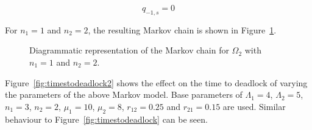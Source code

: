\documentclass{article}
\numberwithin{equation}{section}
\begin{document}
\begin{equation}\label{eqn:2nsssC}
  q_{-1, s} = 0
\end{equation}

For $n_1 = 1$ and $n_2 = 2$, the resulting Markov chain is shown in Figure~\ref{fig:2nodeMC}.

\begin{figure}[!htbp]
    \begin{center}
    
    \end{center}
    \caption{Diagrammatic representation of the Markov chain for $\Omega_2$ with $n_1=1$ and $n_2=2$.}
    \label{fig:2nodeMC}
\end{figure}

Figure~\ref{fig:timestodeadlock2} shows the effect on the time to deadlock of varying the parameters of the above Markov model.
Base parameters of $\Lambda_1 = 4$, $\Lambda_2 = 5$, $n_1 = 3$, $n_2 = 2$, $\mu_1 = 10$, $\mu_2 = 8$, $r_{12} = 0.25$ and $r_{21} = 0.15$ are used.
Similar behaviour to Figure~\ref{fig:timestodeadlock} can be seen.
\end{document}
